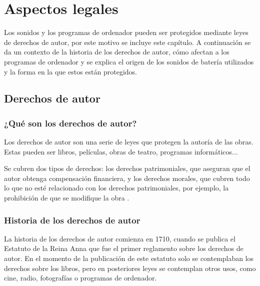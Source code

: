
\chapter{Aspectos legales} %
\label{cha:AspectosLegales}

    Los sonidos y los programas de ordenador pueden ser protegidos mediante leyes de derechos de autor, por este motivo
    se incluye este capítulo. A continuación se da un contexto de la historia de los derechos de autor, cómo afectan a
    los programas de ordenador y se explica el origen de los sonidos de batería utilizados y la forma en la que estos
    están protegidos.

    \section{Derechos de autor} %
    \label{sec:DerechosDeAutor}
        \subsection{¿Qué son los derechos de autor?} %
        \label{sub:QueSonLosDerechosDeAutor}

            Los derechos de autor son una serie de leyes que protegen la autoría de las obras. Estas pueden ser libros,
            películas, obras de teatro, programas informáticos...

            Se cubren dos tipos de derechos: los derechos patrimoniales, que aseguran que el autor obtenga compensación
            financiera, y los derechos morales, que cubren todo lo que no esté relacionado con los derechos
            patrimoniales, por ejemplo, la prohibición de que se modifique la obra \cite{derechos_ompi}.


        \subsection{Historia de los derechos de autor} %
        \label{sub:HistoriaDeLosDerechosDeAutor}

            La historia de los derechos de autor comienza en 1710, cuando se publica el Estatuto de la Reina
            Anna \cite{estatuto_anna} que fue el primer reglamento sobre los derechos de autor. En el momento de la
            publicación de este estatuto solo se contemplaban los derechos sobre los libros, pero en posteriores leyes
            se contemplan otros usos, como cine, radio, fotografías o programas de ordenador.

